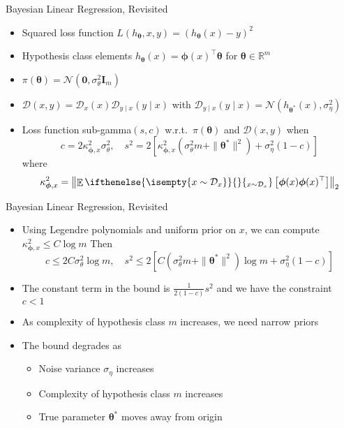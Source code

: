 \documentclass[aspectratio=169]{beamer}
\DeclareMathOperator*{\EvOp}{\mathbb{E}}
\newcommand{\CD}{\mathcal{D}}
\newcommand{\RR}{\mathbb{R}}
\newcommand*{\Ev}[2][]{%
  \mathchoice{%
    \EvOp\ifthenelse{\isempty{#1}}{}{_{#1}}\left[#2\right]%
  }{%
    \EvOp\ifthenelse{\isempty{#1}}{}{_{#1}}[#2]%
  }{%
    \EvOp\ifthenelse{\isempty{#1}}{}{_{#1}}[#2]%
  }{%
    \EvOp\ifthenelse{\isempty{#1}}{}{_{#1}}[#2]%
  }%
}
\begin{document}
\begin{frame}{Bayesian Linear Regression, Revisited}
  \begin{itemize}
    \item
      Squared loss function $L(h_{\bm{\theta}}, x, y) = (h_{\bm{\theta}}(x) -
      y)^2$
    \item
      Hypothesis class elements $h_{\bm{\theta}}(x) = \bm{\phi}(x)^\top
      \bm{\theta}$ for $\bm{\theta} \in \RR^m$
    \item
      $\pi(\bm{\theta}) = \mathcal{N}(\bm{0}, \sigma_\theta^2
      \mathbf{I}_m)$
    \item
      $\CD(x, y) = \CD_x(x) \CD_{y \mid x}(y \mid x)$ with
      $\CD_{y \mid x}(y \mid x) = \mathcal{N}(h_{\bm{\theta}^*}(x),
      \sigma_\eta^2)$
    \item
      Loss function sub-gamma$(s, c)$ w.r.t.\ $\pi(\bm{\theta})$ and $\CD(x, y)$
      when
      \begin{equation*}
        c = 2 \kappa_{\bm{\phi},x}^2 \sigma_\theta^2, \quad s^2 = 2
        [\kappa_{\bm{\phi},x}^2 (\sigma_\theta^2 m + \| \bm{\theta}^* \|^2) +
        \sigma_\eta^2 (1 - c)] 
      \end{equation*}
      where
      \begin{equation*}
        \kappa_{\bm{\phi},x}^2 = \left\| \Ev[x \sim \CD_x]{\bm{\phi}(x)
        \bm{\phi}(x)^\top} \right\|_2
      \end{equation*}
  \end{itemize}
\end{frame}

\begin{frame}{Bayesian Linear Regression, Revisited}
  \begin{itemize}
    \item
      Using Legendre polynomials and uniform prior on $x$, we can compute
      $\kappa_{\bm{\phi},x}^2 \leq C \log m$ Then
      \begin{equation*}
        c \leq 2 C \sigma_\theta^2 \log m, \quad s^2 \leq 2 [C (\sigma_\theta^2
        m + \| \bm{\theta}^* \|^2) \log m + \sigma_\eta^2 (1 - c)]
      \end{equation*}
    \item
      The constant term in the bound is $\frac{1}{2(1 - c)} s^2$ and we have the
      constraint $c < 1$
    \item
      As complexity of hypothesis class $m$ increases, we need narrow priors
    \item
      The bound degrades as
      \begin{itemize}
        \item
          Noise variance $\sigma_\eta$ increases
        \item
          Complexity of hypothesis class $m$ increases
        \item
          True parameter $\bm{\theta}^*$ moves away from origin
      \end{itemize}
  \end{itemize}
\end{frame}
\end{document}
